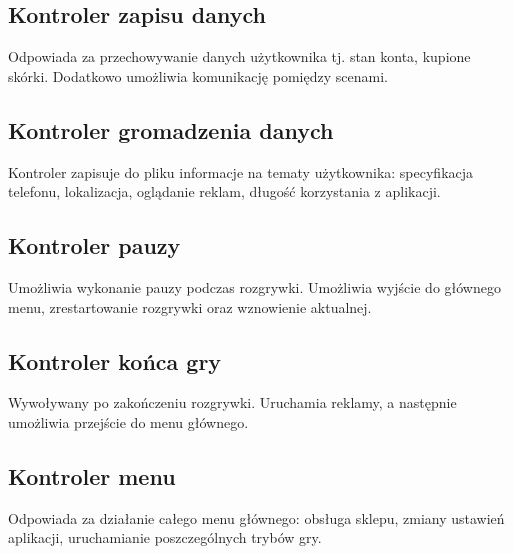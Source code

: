 \subsection{Kontroler zapisu danych}
Odpowiada za przechowywanie danych użytkownika tj. stan konta, kupione skórki. Dodatkowo umożliwia komunikację pomiędzy scenami.

\subsection{Kontroler gromadzenia danych}
Kontroler zapisuje do pliku informacje na tematy użytkownika: specyfikacja\\ telefonu, lokalizacja, oglądanie reklam, długość korzystania z aplikacji.

\subsection{Kontroler pauzy}
Umożliwia wykonanie pauzy podczas rozgrywki. Umożliwia wyjście do głównego menu, zrestartowanie rozgrywki oraz wznowienie aktualnej.

\subsection{Kontroler końca gry}
Wywoływany po zakończeniu rozgrywki. Uruchamia reklamy, a następnie umożliwia przejście do menu głównego.

\subsection{Kontroler menu}
Odpowiada za działanie całego menu głównego: obsługa sklepu, zmiany ustawień aplikacji, uruchamianie poszczególnych trybów gry.

